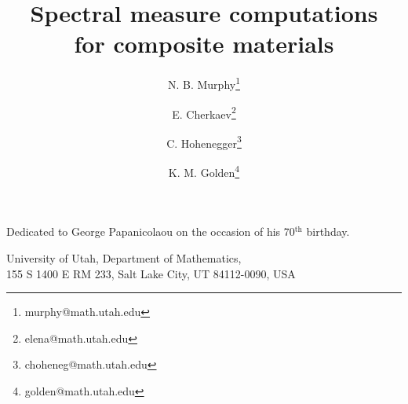 \documentclass{cmslatex}
\begin{document}
\title{Spectral measure computations \\ for composite materials}
%
\author{N. B. Murphy\thanks {murphy@math.utah.edu}
%
\and E. Cherkaev\thanks {elena@math.utah.edu}
%
\and C. Hohenegger\thanks {choheneg@math.utah.edu}
%
\and K. M. Golden\thanks {golden@math.utah.edu}
}



\pagestyle{myheadings} 
\maketitle

\begin{center}
  Dedicated to George Papanicolaou on the occasion of his 70$^\text{th}$ birthday.
\end{center}

\vspace{2ex}

\begin{center}
University of Utah, Department of Mathematics, \\ 155 S 1400 E
  RM 233, Salt Lake City, UT 84112-0090, USA
\end{center}

\vspace{3ex}
\end{document}

